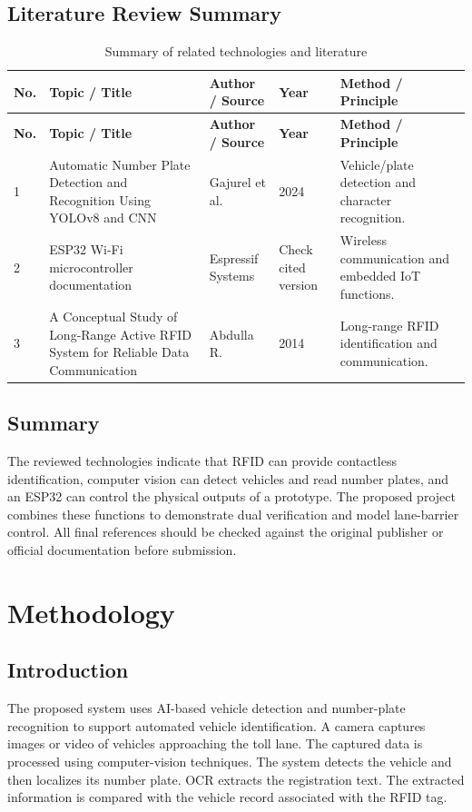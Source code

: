 \documentclass[12pt,a4paper]{report}
\begin{document}
\section{Literature Review Summary}
\begin{longtable}{p{}p{}p{}p{}p{}}
\caption{Summary of related technologies and literature}\\
\toprule
\textbf{No.} & \textbf{Topic / Title} & \textbf{Author / Source} & \textbf{Year} & \textbf{Method / Principle}\\
\midrule
\endfirsthead
\toprule
\textbf{No.} & \textbf{Topic / Title} & \textbf{Author / Source} & \textbf{Year} & \textbf{Method / Principle}\\
\midrule
\endhead
1 & Automatic Number Plate Detection and Recognition Using YOLOv8 and CNN & Gajurel et al. & 2024 & Vehicle/plate detection and character recognition.\\
2 & ESP32 Wi-Fi microcontroller documentation & Espressif Systems & Check cited version & Wireless communication and embedded IoT functions.\\
3 & A Conceptual Study of Long-Range Active RFID System for Reliable Data Communication & Abdulla R. & 2014 & Long-range RFID identification and communication.\\
\bottomrule
\end{longtable}

\section{Summary}
The reviewed technologies indicate that RFID can provide contactless identification,
computer vision can detect vehicles and read number plates, and an ESP32 can control
the physical outputs of a prototype. The proposed project combines these functions
to demonstrate dual verification and model lane-barrier control. All final references
should be checked against the original publisher or official documentation before
submission.

\chapter{Methodology}
\section{Introduction}
The proposed system uses AI-based vehicle detection and number-plate recognition to
support automated vehicle identification. A camera captures images or video of vehicles
approaching the toll lane. The captured data is processed using computer-vision
techniques. The system detects the vehicle and then localizes its number plate. OCR
extracts the registration text. The extracted information is compared with the vehicle
record associated with the RFID tag.
\end{document}
